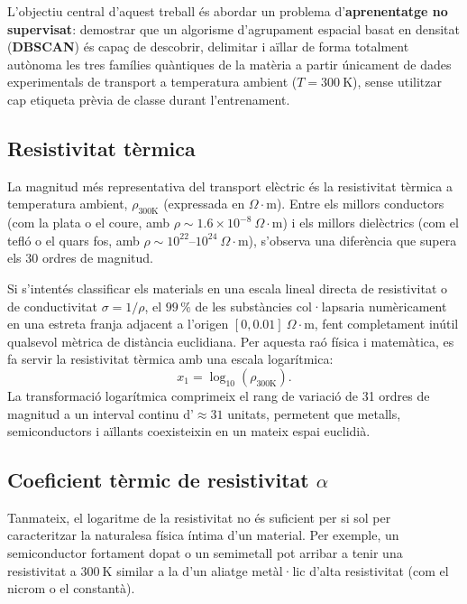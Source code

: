 \documentclass[a4paper,11pt]{article}
\begin{document}
L'objectiu central d'aquest treball és abordar un problema d'\textbf{aprenentatge no supervisat}: demostrar que un algorisme d'agrupament espacial basat en densitat (\textbf{DBSCAN}) és capaç de descobrir, delimitar i aïllar de forma totalment autònoma les tres famílies quàntiques de la matèria a partir únicament de dades experimentals de transport a temperatura ambient ($T = 300\ \text{K}$), sense utilitzar cap etiqueta prèvia de classe durant l'entrenament.

\subsection{Resistivitat tèrmica}

La magnitud més representativa del transport elèctric és la resistivitat tèrmica a temperatura ambient, $\rho_{300\mathrm{K}}$ (expressada en $\Omega\cdot\text{m}$). Entre els millors conductors (com la plata o el coure, amb $\rho \sim 1.6 \times 10^{-8}\ \Omega\cdot\text{m}$) i els millors dielèctrics (com el tefló o el quars fos, amb $\rho \sim 10^{22}$--$10^{24}\ \Omega\cdot\text{m}$), s'observa una diferència que supera els 30 ordres de magnitud.

Si s'intentés classificar els materials en una escala lineal directa de resistivitat o de conductivitat $\sigma = 1/\rho$, el $99\,\%$ de les substàncies col·lapsaria numèricament en una estreta franja adjacent a l'origen $[0, 0.01]\ \Omega\cdot\text{m}$, fent completament inútil qualsevol mètrica de distància euclidiana. Per aquesta raó física i matemàtica, es fa servir la resistivitat tèrmica amb una escala logarítmica:
\begin{equation}
    x_1 = \log_{10}(\rho_{300\mathrm{K}}).
\end{equation}
La transformació logarítmica comprimeix el rang de variació de 31 ordres de magnitud a un interval continu d'$\approx 31$ unitats, permetent que metalls, semiconductors i aïllants coexisteixin en un mateix espai euclidià.

\subsection{Coeficient tèrmic de resistivitat $\alpha$}

Tanmateix, el logaritme de la resistivitat no és suficient per si sol per caracteritzar la naturalesa física íntima d'un material. Per exemple, un semiconductor fortament dopat o un semimetall pot arribar a tenir una resistivitat a $300\ \text{K}$ similar a la d'un aliatge metàl·lic d'alta resistivitat (com el nicrom o el constantà).
\end{document}
